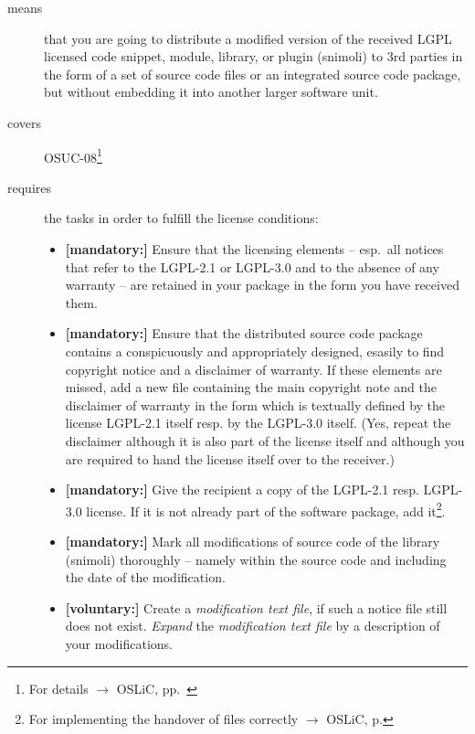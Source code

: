 \begin{description}
\item[means] that you are going to distribute a modified version of the received
LGPL licensed code snippet, module, library, or plugin (snimoli) to 3rd
parties in the form of a set of source code files or an integrated source code
package, but without embedding it into another larger software unit.
\item[covers] OSUC-08\footnote{For details $\rightarrow$ OSLiC, pp.\ \pageref{OSUC-08-DEF}}
\item[requires] the tasks in order to fulfill the license conditions:
\begin{itemize}
 
   \item \textbf{[mandatory:]} Ensure that the licensing elements -- esp.\ all
  notices that refer to the LGPL-2.1 or LGPL-3.0 and to the absence of any
  warranty -- are retained in your package in the form you have received them.

  \item \textbf{[mandatory:]} Ensure that the distributed source code package
  contains a conspicuously and appropriately designed, esasily to find copyright
  notice and a disclaimer of warranty. If these elements are missed, add a new
  file containing the main copyright note and the disclaimer of warranty in the
  form which is textually defined by the license LGPL-2.1 itself resp. by the
  LGPL-3.0 itself. (Yes, repeat the disclaimer although it is also part of the
  license itself and although you are required to hand the license itself over
  to the receiver.)
  
  \item \textbf{[mandatory:]} Give the recipient a copy of the LGPL-2.1 resp.
  LGPL-3.0 license. If it is not already part of the software package, add
  it\footnote{For implementing the handover of files correctly $\rightarrow$
  OSLiC, p. \pageref{DistributingFilesHint}}.
  
  \item \textbf{[mandatory:]} Mark all modifications of source code of the
  library (snimoli) thoroughly -- namely within the source code and including
  the date of the modification.
    
  \item \textbf{[voluntary:]} Create a \emph{modification text file}, if such a
  notice file still does not exist. \emph{Expand} the \emph{modification text
  file} by a description of your modifications.
  

\end{itemize}
\end{description}
